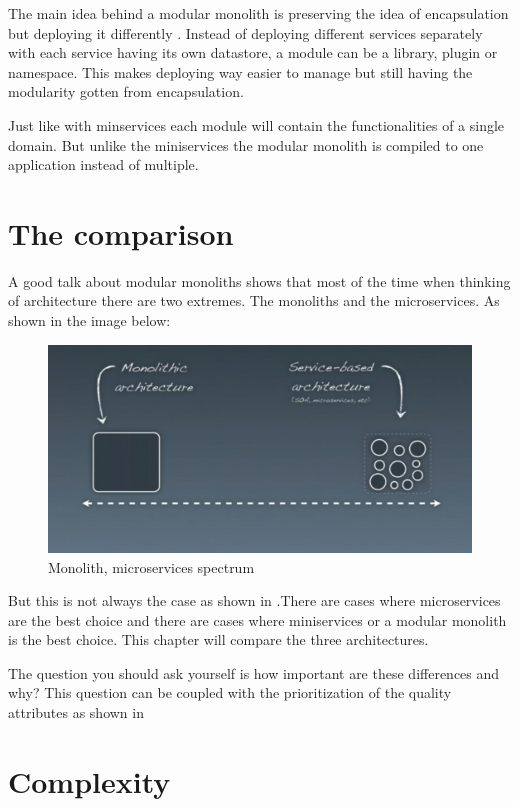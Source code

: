 The main idea behind a modular monolith is preserving the idea of encapsulation but deploying it differently \cite{modularMonolithIdea}. Instead of deploying different services separately with each service having its own datastore, a module can be a library, plugin or namespace. This makes deploying way easier to manage but still having the modularity gotten from encapsulation.

Just like with minservices each module will contain the functionalities of a single domain. But unlike the miniservices the modular monolith is compiled to one application instead of multiple.

\section{The comparison}
\label{sec:Comparison}

A good talk about modular monoliths \cite{modularMonolithTalk} shows that most of the time when thinking of architecture there are two extremes. The monoliths and the microservices. As shown in the image below:
\begin{figure}[H]
	\includegraphics[width=\linewidth]{microservices-spectrum.png}
	\caption{Monolith, microservices spectrum \cite{modularMonolithTalk}}
\end{figure}

But this is not always the case as shown in .There are cases where microservices are the best choice and there are cases where miniservices or a modular monolith is the best choice. This chapter will compare the three architectures.

The question you should ask yourself is how important are these differences and why? This question can be coupled with the prioritization of the quality attributes as shown in 

\section{Complexity}
\label{sec:Complexity}

